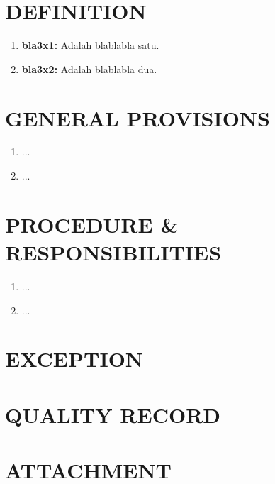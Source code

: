 \documentclass[12pt]{soi_v2}
\begin{document}
    \section{DEFINITION}
    \begin{enumerate}
        \item \textbf{bla3x1:} Adalah blablabla satu.
        \item \textbf{bla3x2:} Adalah blablabla dua.
    \end{enumerate}

    \section{GENERAL PROVISIONS}
    \begin{enumerate}
        \item ...
        \item ...
    \end{enumerate}

    \section{PROCEDURE \& RESPONSIBILITIES}
    \begin{enumerate}
        \item ...
        \item ...
    \end{enumerate}

    \section{EXCEPTION}
    \section{QUALITY RECORD}
    \section{ATTACHMENT}
\end{document}
